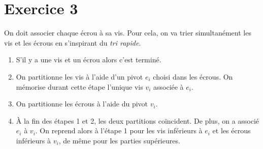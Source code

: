 \documentclass[td7.tex]{subfiles}
\begin{document}
\section*{Exercice 3}
On doit associer chaque écrou à sa vis. Pour cela, on va trier simultanément les vis et les écrous en s'inspirant du \emph{tri rapide}.

\begin{enumerate}
\item S'il y a une vis et un écrou alors c'est terminé.
\item On partitionne les vis à l'aide d'un pivot $e_i$ choisi dans les écrous.
  On mémorise durant cette étape l'unique vis $v_i$ associée à $e_i$.
\item On partitionne les écrous à l'aide du pivot $v_i$.
\item \`{A} la fin des étapes 1 et 2, les deux partitions coïncident. De plus, on a associé $e_i$ à $v_i$.
  On reprend alors à l'étape 1 pour les vis inférieurs à $e_i$ et les écrous inférieurs à $v_i$, de même pour les parties supérieures.
\end{enumerate}

\inputminted[mathescape, firstline=10, lastline=31]{python}{vis_ecrou.py}
\end{document}

